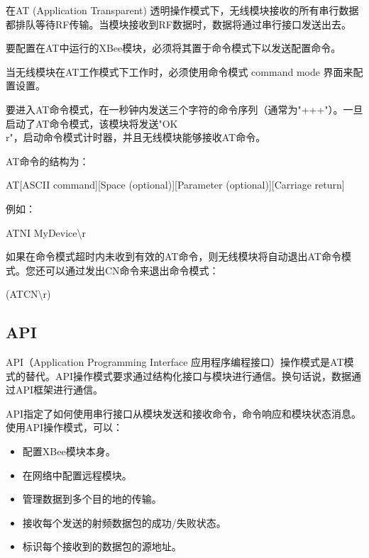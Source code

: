 在AT (Application Transparent) 透明操作模式下，无线模块接收的所有串行数据都排队等待RF传输。当模块接收到RF数据时，数据将通过串行接口发送出去。

要配置在AT中运行的XBee模块，必须将其置于命令模式下以发送配置命令。

当无线模块在AT工作模式下工作时，必须使用命令模式 command mode 界面来配置设置。

要进入AT命令模式，在一秒钟内发送三个字符的命令序列（通常为"+++"）。一旦启动了AT命令模式，该模块将发送"OK \\ r"，启动命令模式计时器，并且无线模块能够接收AT命令。

AT命令的结构为：

\begin{tcolorbox}
    AT[ASCII command][Space (optional)][Parameter (optional)][Carriage return]
\end{tcolorbox}

例如：

\begin{tcolorbox}
    ATNI MyDevice\textbackslash{}r
\end{tcolorbox}

如果在命令模式超时内未收到有效的AT命令，则无线模块将自动退出AT命令模式。您还可以通过发出CN命令来退出命令模式：

\begin{tcolorbox}
    (ATCN\textbackslash{}r)
\end{tcolorbox}

\subsection{API}

API（Application Programming Interface 应用程序编程接口）操作模式是AT模式的替代。API操作模式要求通过结构化接口与模块进行通信。换句话说，数据通过API框架进行通信。

API指定了如何使用串行接口从模块发送和接收命令，命令响应和模块状态消息。使用API​​操作模式，可以：

\begin{itemize}
    \item 配置XBee模块本身。
    \item 在网络中配置远程模块。
    \item 管理数据到多个目的地的传输。
    \item 接收每个发送的射频数据包的成功/失败状态。
    \item 标识每个接收到的数据包的源地址。
\end{itemize}

